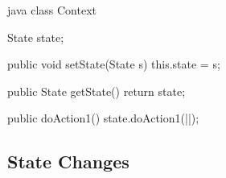 \begin{codeboxNl}[Context]{java}
  class Context{
    State state;
    
    public void setState(State s){
      this.state = s;
    }

    public State getState(){
      return state;
    }

    public doAction1(){
      state.doAction1(|\ul{}|);
    }

  }
\end{codeboxNl}
\begin{codeboxNl}[State]{java}
  abstract class State {
    privat void doAction1(|\ul{}|,||){
      throw new IllegalStateException();
    }
  }
}
\end{codeboxNl}
\subsection*{State Changes}
